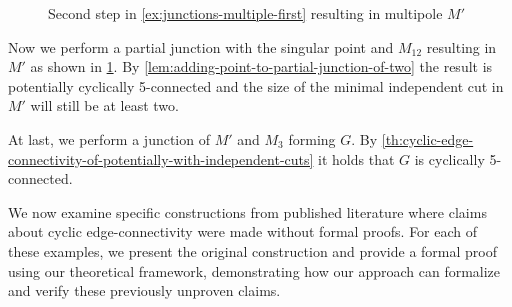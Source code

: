 \documentclass[12pt, twoside]{book}
\begin{document}
\begin{example}
\begin{figure}
		\caption{Second step in \cref{ex:junctions-multiple-first} resulting in multipole $M'$}
		\label{fig:3-5-poles-connected-step-2}
	\end{figure}
	
	Now we perform a partial junction with the singular point and $M_{12}$ resulting in $M'$ as shown in \cref{fig:3-5-poles-connected-step-2}. By \cref{lem:adding-point-to-partial-junction-of-two} the result is potentially cyclically 5-connected and the size of the minimal independent cut in $M'$ will still be at least two.
	
	At last, we perform a junction of $M'$ and $M_3$ forming $G$. By \cref{th:cyclic-edge-connectivity-of-potentially-with-independent-cuts} it holds that $G$ is cyclically 5-connected.
\end{example}

We now examine specific constructions from published literature where claims about cyclic edge-connectivity were made without formal proofs. For each of these examples, we present the original construction and provide a formal proof using our theoretical framework, demonstrating how our approach can formalize and verify these previously unproven claims.
\end{document}
